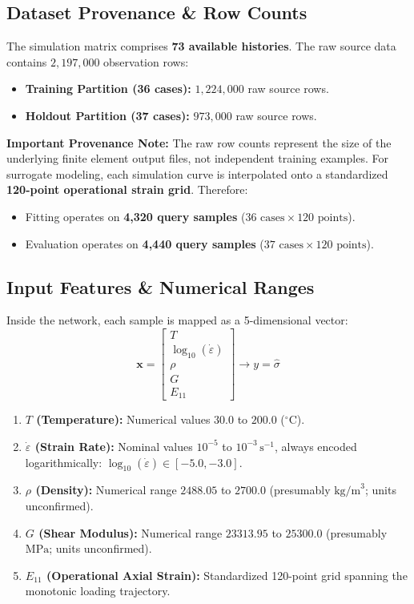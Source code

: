 \documentclass[11pt,a4paper]{article}
\begin{document}
\subsection{Dataset Provenance \& Row Counts}
The simulation matrix comprises \textbf{73 available histories}. The raw source data contains $2{,}197{,}000$ observation rows:
\begin{itemize}
    \item \textbf{Training Partition (36 cases):} $1{,}224{,}000$ raw source rows.
    \item \textbf{Holdout Partition (37 cases):} $973{,}000$ raw source rows.
\end{itemize}
\textbf{Important Provenance Note:} The raw row counts represent the size of the underlying finite element output files, not independent training examples. For surrogate modeling, each simulation curve is interpolated onto a standardized \textbf{120-point operational strain grid}. Therefore:
\begin{itemize}
    \item Fitting operates on \textbf{4,320 query samples} ($36 \text{ cases} \times 120 \text{ points}$).
    \item Evaluation operates on \textbf{4,440 query samples} ($37 \text{ cases} \times 120 \text{ points}$).
\end{itemize}

\subsection{Input Features \& Numerical Ranges}
Inside the network, each sample is mapped as a 5-dimensional vector:
\begin{equation}
    \mathbf{x} = \begin{bmatrix} T \\ \log_{10}(\dot{\varepsilon}) \\ \rho \\ G \\ E_{11} \end{bmatrix} \longrightarrow y = \hat{\sigma}
\end{equation}
\begin{enumerate}
    \item \textbf{$T$ (Temperature):} Numerical values $30.0$ to $200.0$ ($^\circ\text{C}$).
    \item \textbf{$\dot{\varepsilon}$ (Strain Rate):} Nominal values $10^{-5}$ to $10^{-3}\,\text{s}^{-1}$, always encoded logarithmically: $\log_{10}(\dot{\varepsilon}) \in [-5.0, -3.0]$.
    \item \textbf{$\rho$ (Density):} Numerical range $2488.05$ to $2700.0$ (presumably $\text{kg/m}^3$; units unconfirmed).
    \item \textbf{$G$ (Shear Modulus):} Numerical range $23313.95$ to $25300.0$ (presumably $\text{MPa}$; units unconfirmed).
    \item \textbf{$E_{11}$ (Operational Axial Strain):} Standardized 120-point grid spanning the monotonic loading trajectory.
\end{enumerate}
\end{document}
